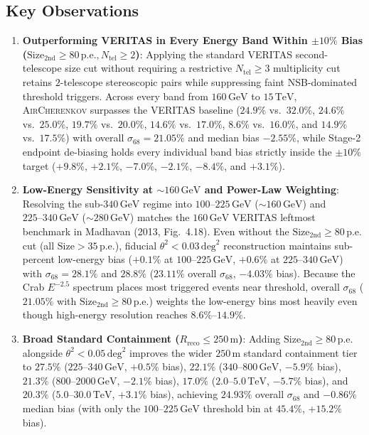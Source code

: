 \documentclass[11pt,a4paper]{article}
\begin{document}
\subsection{Key Observations}
\begin{enumerate}
    \item \textbf{Outperforming VERITAS in Every Energy Band Within $\pm 10\%$ Bias ($\text{Size}_{2\text{nd}} \ge 80\,\text{p.e.}, N_\text{tel} \ge 2$)}: Applying the standard VERITAS second-telescope size cut without requiring a restrictive $N_\text{tel} \ge 3$ multiplicity cut retains $2$-telescope stereoscopic pairs while suppressing faint NSB-dominated threshold triggers. Across every band from $160\,\text{GeV}$ to $15\,\text{TeV}$, \textsc{AirCherenkov} surpasses the VERITAS baseline ($\mathbf{24.9\%}$ vs.~$32.0\%$, $\mathbf{24.6\%}$ vs.~$25.0\%$, $\mathbf{19.7\%}$ vs.~$20.0\%$, $\mathbf{14.6\%}$ vs.~$17.0\%$, $\mathbf{8.6\%}$ vs.~$16.0\%$, and $\mathbf{14.9\%}$ vs.~$17.5\%$) with overall $\sigma_{68} = \mathbf{21.05\%}$ and median bias $\mathbf{-2.55\%}$, while Stage-2 endpoint de-biasing holds every individual band bias strictly inside the $\pm 10\%$ target ($+9.8\%$, $+2.1\%$, $-7.0\%$, $-2.1\%$, $-8.4\%$, and $+3.1\%$).
    \item \textbf{Low-Energy Sensitivity at $\sim 160\,\text{GeV}$ and Power-Law Weighting}: Resolving the sub-$340\,\text{GeV}$ regime into $100\text{--}225\,\text{GeV}$ ($\sim 160\,\text{GeV}$) and $225\text{--}340\,\text{GeV}$ ($\sim 280\,\text{GeV}$) matches the $160\,\text{GeV}$ VERITAS leftmost benchmark in Madhavan (2013, Fig.~4.18). Even without the $\text{Size}_{2\text{nd}} \ge 80\,\text{p.e.}$ cut (all $\text{Size} > 35\,\text{p.e.}$), fiducial $\theta^2 < 0.03\,\text{deg}^2$ reconstruction maintains sub-percent low-energy bias ($\mathbf{+0.1\%}$ at $100\text{--}225\,\text{GeV}$, $\mathbf{+0.6\%}$ at $225\text{--}340\,\text{GeV}$) with $\sigma_{68} = 28.1\%$ and $28.8\%$ ($\mathbf{23.11\%}$ overall $\sigma_{68}$, $\mathbf{-4.03\%}$ bias). Because the Crab $E^{-2.5}$ spectrum places most triggered events near threshold, overall $\sigma_{68}$ ($21.05\%$ with $\text{Size}_{2\text{nd}} \ge 80\,\text{p.e.}$) weights the low-energy bins most heavily even though high-energy resolution reaches $8.6\%\text{--}14.9\%$.
    \item \textbf{Broad Standard Containment ($R_\text{reco} \le 250\,\text{m}$)}: Adding $\text{Size}_{2\text{nd}} \ge 80\,\text{p.e.}$ alongside $\theta^2 < 0.05\,\text{deg}^2$ improves the wider $250\,\text{m}$ standard containment tier to $\mathbf{27.5\%}$ ($225\text{--}340\,\text{GeV}$, $+0.5\%$ bias), $\mathbf{22.1\%}$ ($340\text{--}800\,\text{GeV}$, $-5.9\%$ bias), $\mathbf{21.3\%}$ ($800\text{--}2000\,\text{GeV}$, $-2.1\%$ bias), $\mathbf{17.0\%}$ ($2.0\text{--}5.0\,\text{TeV}$, $-5.7\%$ bias), and $\mathbf{20.3\%}$ ($5.0\text{--}30.0\,\text{TeV}$, $+3.1\%$ bias), achieving $\mathbf{24.93\%}$ overall $\sigma_{68}$ and $\mathbf{-0.86\%}$ median bias (with only the $100\text{--}225\,\text{GeV}$ threshold bin at $45.4\%$, $+15.2\%$ bias).

\end{enumerate}
\end{document}
